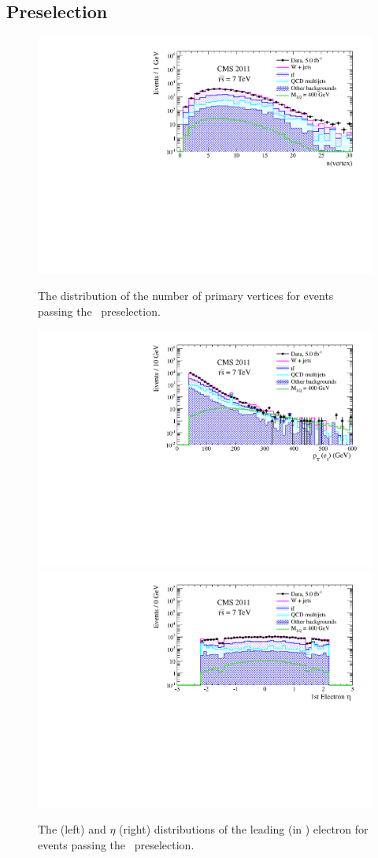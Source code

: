 \subsection{Preselection}
\label{sec:enujjPreselection}

\begin{figure}[htbp]
  \begin{center}
    {\includegraphics[width=.45\textwidth]{tex/analysis/event_selection/fig/enu/preselection/nVertex_PAS_enujj_WZSherpa_noNSigma.pdf}}\\
    \caption{
      The distribution of the number of primary vertices for events passing the
      \enujj~preselection.
    }
    \label{fig:enujj_preselection_vertices}
  \end{center}
\end{figure}

\begin{figure}[htbp]
  \begin{center}
    {\includegraphics[width=.45\textwidth]{tex/analysis/event_selection/fig/enu/preselection/Pt1stEle_PAS_enujj_WZSherpa_noNSigma.pdf}}
    {\includegraphics[width=.45\textwidth]{tex/analysis/event_selection/fig/enu/preselection/Eta1stEle_PAS_enujj_WZSherpa_noNSigma.pdf}}
    \caption{
      The \pt (left) and $\eta$ (right) distributions of the leading
      (in \pt) electron for events passing the \enujj~preselection.
    }
    \label{fig:enujj_preselection_ele1}
  \end{center}
\end{figure}

